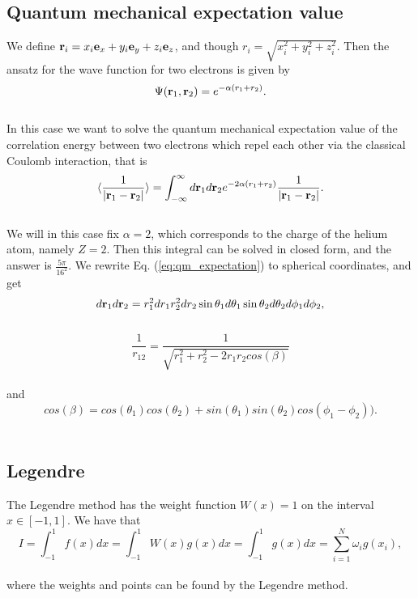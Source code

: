 \documentclass[12pt]{article}
\begin{document}
\begin{flushleft}
\subsection{Quantum mechanical expectation value}
We define ${\bf r}_i =  x_i {\bf e}_x + y_i {\bf e}_y +z_i {\bf e}_z $, and though $r_i = \sqrt{x_i^2+y_i^2+z_i^2}$. Then the ansatz for the wave function for two electrons is given by\\
\vspace{5mm}
$$\Psi({\bf r}_1,{\bf r}_2)  =   e^{-\alpha (r_1+r_2)}.$$\\
\vspace{5mm}
In this case we want to solve the quantum mechanical expectation value of the correlation energy between two electrons which repel each other via the classical Coulomb interaction, that is\\
\vspace{5mm}
\begin{equation}\label{eq:qm_expectation}
   \langle \frac{1}{|{\bf r}_1-{\bf r}_2|} \rangle =
   \int_{-\infty}^{\infty} d{\bf r}_1d{\bf r}_2  e^{-2\alpha (r_1+r_2)}\frac{1}{|{\bf r}_1-{\bf r}_2|}.
\end{equation}\\
\vspace{5mm}
We will in this case fix $\alpha = 2$, which corresponds to the charge of the helium atom, namely $Z = 2$. Then this integral can be solved in closed form, and the answer is $\frac{5\pi}{16^2}$. We rewrite Eq. (\ref{eq:qm_expectation}) to spherical coordinates, and get\\
\vspace{5mm}
$$   d{\bf r}_1d{\bf r}_2  = r_1^2dr_1 r_2^2dr_2 \sin\theta_1 d\theta_1 \sin\theta_2 d\theta_2 d\phi_1d\phi_2,$$\\
\vspace{5mm}
$$   \frac{1}{r_{12}}= \frac{1}{\sqrt{r_1^2+r_2^2-2r_1r_2cos(\beta)}}$$\\
and
$$cos(\beta) = cos(\theta_1)cos(\theta_2)+sin(\theta_1)sin(\theta_2)cos(\phi_1-\phi_2)).$$\\
\subsection{Legendre}
The Legendre method has the weight function $W(x) = 1$ on the interval $x\in[-1,1]$. We have that\\
\vspace{5mm}
$$I = \int_{-1}^1 f(x)dx = \int_{-1}^1 W(x)g(x)dx = \int_{-1}^1 g(x)dx = \sum\limits_{i=1}^N \omega_i g(x_i),$$\\   
\vspace{5mm}
where the weights and points can be found by the Legendre method. 


\end{flushleft}
\end{document}
